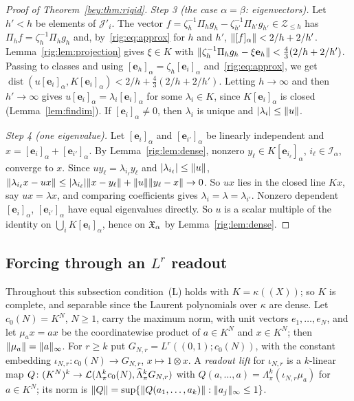 \begin{proof}[Proof of Theorem~\textup{\ref{bey:thm:rigid}}]
\emph{Step 3 (the case $\alpha=\beta$: eigenvectors).} Let $h'<h$ be elements of $\mathcal J'_i$. The vector
$f=\zeta_h^{-1}\Pi_hg_h-\zeta_{h'}^{-1}\Pi_{h'}g_{h'}\in\mathcal Z_{\le h}$ has $\Pi_hf=\zeta_h^{-1}\Pi_hg_h$ and, by~\eqref{rig:eq:approx}
for $h$ and $h'$, $\lVert [f]_\alpha\rVert<2/h+2/h'$. Lemma~\ref{rig:lem:projection} gives $\xi\in K$ with
$\lVert \zeta_h^{-1}\Pi_hg_h-\xi\mathbf e_h\rVert<\frac43(2/h+2/h')$. Passing to classes and using
$[\mathbf e_h]_\alpha=\zeta_h[\mathbf e_i]_\alpha$ and~\eqref{rig:eq:approx}, we get
$\operatorname{dist}(u[\mathbf e_i]_\alpha,K[\mathbf e_i]_\alpha)<2/h+\frac43(2/h+2/h')$. Letting $h\to\infty$ and then
$h'\to\infty$ gives $u[\mathbf e_i]_\alpha=\lambda_i[\mathbf e_i]_\alpha$ for some $\lambda_i\in K$, since
$K[\mathbf e_i]_\alpha$ is closed (Lemma~\ref{lem:findim}). If $[\mathbf e_i]_\alpha\ne0$, then $\lambda_i$ is unique
and $\lvert \lambda_i\rvert\le\lVert u\rVert$.

\emph{Step 4 (one eigenvalue).} Let $[\mathbf e_i]_\alpha$ and $[\mathbf e_{i'}]_\alpha$ be linearly independent and
$x=[\mathbf e_i]_\alpha+[\mathbf e_{i'}]_\alpha$. By Lemma~\ref{rig:lem:dense}, nonzero
$y_\ell\in K[\mathbf e_{i_\ell}]_\alpha$, $i_\ell\in\mathcal I_\alpha$, converge to $x$. Since
$uy_\ell=\lambda_{i_\ell}y_\ell$ and $\lvert \lambda_{i_\ell}\rvert\le\lVert u\rVert$,
$\lVert \lambda_{i_\ell}x-ux\rVert\le\lvert \lambda_{i_\ell}\rvert\lVert x-y_\ell\rVert+\lVert u\rVert\lVert y_\ell-x\rVert\to0$. So $ux$ lies in the
closed line $Kx$, say $ux=\lambda x$, and comparing coefficients gives $\lambda_i=\lambda=\lambda_{i'}$. Nonzero
dependent $[\mathbf e_i]_\alpha$, $[\mathbf e_{i'}]_\alpha$ have equal eigenvalues directly. So $u$ is a scalar
multiple of the identity on $\bigcup_iK[\mathbf e_i]_\alpha$, hence on $\mathfrak X_\alpha$ by Lemma~\ref{rig:lem:dense}.
\end{proof}

\subsection{Forcing through an \texorpdfstring{$L^r$}{L\textasciicircum r} readout}\label{rig:ssec:forcing}

Throughout this subsection condition~\textup{(L)} holds with $K=\kappa((X))$; so $K$ is complete, and separable since
the Laurent polynomials over $\kappa$ are dense. Let $c_0(N)=K^N$, $N\ge1$, carry the maximum norm, with unit vectors
$e_1,\dots,e_N$, and let $\mu_a x=ax$ be the coordinatewise product of $a\in K^N$ and $x\in K^N$; then
$\lVert \mu_a\rVert=\lVert a\rVert_\infty$. For $r\ge k$ put $G_{N,r}=L^r((0,1);c_0(N))$, with the constant embedding
$\iota_{N,r}\colon c_0(N)\to G_{N,r}$, $x\mapsto1\otimes x$. A \emph{readout lift} for $\iota_{N,r}$ is a $k$\nobreakdash-linear
map $Q\colon(K^N)^k\to\mathcal L(\Lambda^k_\pi c_0(N),\widehat\Lambda^k_\pi G_{N,r})$ with
$Q(a,\dots,a)=\Lambda^k_\pi(\iota_{N,r}\mu_a)$ for $a\in K^N$; its norm is
$\lVert Q\rVert=\sup\{\lVert Q(a_1,\dots,a_k)\rVert:\lVert a_j\rVert_\infty\le1\}$.

